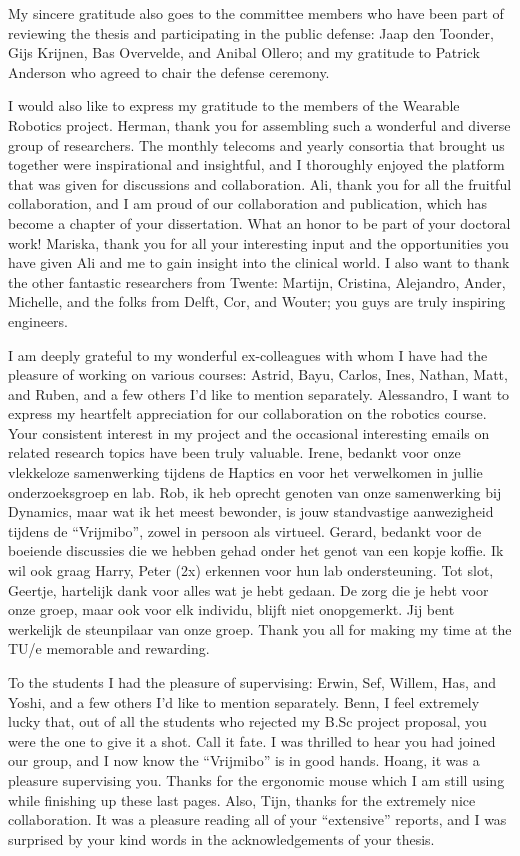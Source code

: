 My sincere gratitude also goes to the committee members who have been part of reviewing the thesis and participating in the public defense: Jaap den Toonder, Gijs Krijnen, Bas Overvelde, and Anibal Ollero; and my gratitude to Patrick Anderson who agreed to chair the defense ceremony.

I would also like to express my gratitude to the members of the {Wearable Robotics} project. Herman, thank you for assembling such a wonderful and diverse group of researchers. The monthly telecoms and yearly consortia that brought us together were inspirational and insightful, and I thoroughly enjoyed the platform that was given for discussions and collaboration. Ali, thank you for all the fruitful collaboration, and I am proud of our collaboration and publication, which has become a chapter of your dissertation. What an honor to be part of your doctoral work! Mariska, thank you for all your interesting input and the opportunities you have given Ali and me to gain insight into the clinical world. I also want to thank the other fantastic researchers from Twente: Martijn, Cristina, Alejandro, Ander, Michelle, and the folks from Delft, Cor, and Wouter; you guys are truly inspiring engineers.

I am deeply grateful to my wonderful ex-colleagues with whom I have had the pleasure of working on various courses: Astrid, Bayu, Carlos, Ines, Nathan, Matt, and Ruben, and a few others I'd like to mention separately. Alessandro, I want to express my heartfelt appreciation for our collaboration on the robotics course. Your consistent interest in my project and the occasional interesting emails on related research topics have been truly valuable. Irene, bedankt voor onze vlekkeloze samenwerking tijdens de Haptics en voor het verwelkomen in jullie onderzoeksgroep en lab. Rob, ik heb oprecht genoten van onze samenwerking bij Dynamics, maar wat ik het meest bewonder, is jouw standvastige aanwezigheid tijdens de ``Vrijmibo'', zowel in persoon als virtueel. Gerard, bedankt voor de boeiende discussies die we hebben gehad onder het genot van een kopje koffie. Ik wil ook graag Harry, Peter (2x) erkennen voor hun lab ondersteuning. Tot slot, Geertje, hartelijk dank voor alles wat je hebt gedaan. De zorg die je hebt voor onze groep, maar ook voor elk individu, blijft niet onopgemerkt. Jij bent werkelijk de steunpilaar van onze groep. Thank you all for making my time at the TU/e memorable and rewarding.

To the students I had the pleasure of supervising: Erwin, Sef, Willem, Has, and Yoshi, and a few others I'd like to mention separately. Benn, I feel extremely lucky that, out of all the students who rejected my B.Sc project proposal, you were the one to give it a shot. Call it fate. I was thrilled to hear you had joined our group, and I now know the ``Vrijmibo'' is in good hands. Hoang, it was a pleasure supervising you. Thanks for the ergonomic mouse which I am still using while finishing up these last pages. Also, Tijn, thanks for the extremely nice collaboration. It was a pleasure reading all of your ``extensive'' reports, and I was surprised by your kind words in the acknowledgements of your thesis.

